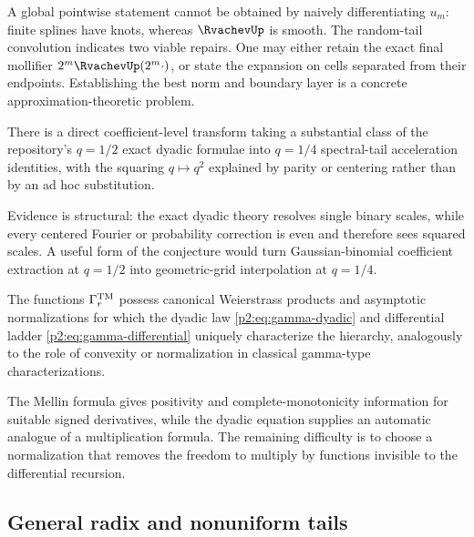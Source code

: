 \documentclass[11pt,oneside]{article}
\numberwithin{equation}{section}
\theoremstyle{definition}
\theoremstyle{remark}
\begin{document}
A global pointwise statement cannot be obtained by naively differentiating $u_m$: finite
splines have knots, whereas $\RvachevUp$ is smooth.  The random-tail convolution indicates two viable
repairs.  One may either retain the exact final mollifier $2^m\RvachevUp(2^m\cdot)$, or state the
expansion on cells separated from their endpoints.  Establishing the best norm and boundary
layer is a concrete approximation-theoretic problem.

\begin{conjecture}
\label{p2:conj:dual-q}
There is a direct coefficient-level transform taking a substantial class of the repository's
$q=1/2$ exact dyadic formulae into $q=1/4$ spectral-tail acceleration identities, with the
squaring $q\mapsto q^2$ explained by parity or centering rather than by an ad hoc substitution.
\end{conjecture}

Evidence is structural: the exact dyadic theory resolves single binary scales, while every
centered Fourier or probability correction is even and therefore sees squared scales.  A
useful form of the conjecture would turn Gaussian-binomial coefficient extraction at
$q=1/2$ into geometric-grid interpolation at $q=1/4$.

\begin{conjecture}
\label{p2:conj:automatic-Barnes}
The functions $\Gamma_r^{\rm TM}$ possess canonical Weierstrass products and asymptotic
normalizations for which the dyadic law \eqref{p2:eq:gamma-dyadic} and differential ladder
\eqref{p2:eq:gamma-differential} uniquely characterize the hierarchy, analogously to the role of
convexity or normalization in classical gamma-type characterizations.
\end{conjecture}

The Mellin formula gives positivity and complete-monotonicity information for suitable signed
derivatives, while the dyadic equation supplies an automatic analogue of a multiplication
formula.  The remaining difficulty is to choose a normalization that removes the freedom to
multiply by functions invisible to the differential recursion.

\subsection{General radix and nonuniform tails}
\end{document}
